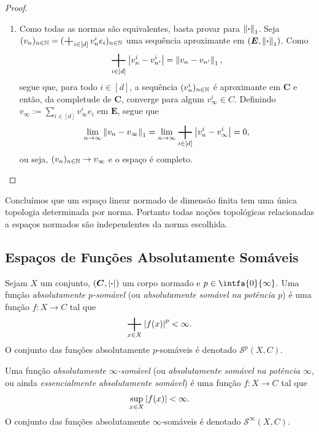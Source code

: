 \begin{proof}
\begin{enumerate}
	\item Como todas as normas são equivalentes, basta provar para $\left\Vert{\bm{\cdot}}\right\Vert_1$. Seja $(v_n)_{n \in \N} = (\sum_{i \in [d]} v_n^i e_i)_{n \in \N}$ uma sequência aproximante em $(\bm E,\left\Vert{\bm{\cdot}}\right\Vert_1)$. Como
		\begin{equation*}
		\sum_{i \in [d]} \abs{v_n^i - v_{n'}^i} = \nor{v_n - v_{n'}}_1,
		\end{equation*}
segue que, para todo $i \in [d]$, a sequência $(v_n^i)_{n \in \mathbb{N}}$ é aproximante em $\bm C$ e então, da completude de $\bm C$, converge para algum $v_\infty^i \in C$. Definindo $v_\infty := \sum_{i \in [d]} v_\infty^ie_i$ em $\bm E$, segue que
	\begin{equation*}
	\lim_{n \conv \infty} \nor{v_n - v_\infty}_1 = \lim_{n \conv \infty} \sum_{i \in [d]} \abs{v_n^i - v_\infty^i} = 0,
	\end{equation*}
ou seja, $(v_n)_{n \in \mathbb{N}} \rightarrow v_\infty$ e o espaço é completo.	
	\end{enumerate}
\end{proof}

Concluímos que um espaço linear normado de dimensão finita tem uma única topologia determinada por norma.
Portanto todas noções topológicas relacionadas a espaços normados são independentes da norma escolhida.














\subsection{Espaços de Funções Absolutamente Somáveis}

\newcommand{\Smvl}{\mathscr{S}}

\begin{defi}
Sejam $X$ um conjunto, $(\bm C,\left\vert{\bm{\cdot}}\right\vert)$ um corpo normado
 e $p \in \intfa{0}{\infty}$. Uma função \emph{absolutamente $p$-somável} (ou \emph{absolutamente somável na potência $p$}) é uma função $f\colon X \to C$ tal que
	\begin{equation*}
	\sum_{x \in X} \abs{f(x)}^p < \infty.
	\end{equation*}
O conjunto das funções absolutamente $p$-somáveis é denotado $\Smvl^p(X,C)$.

Uma função \emph{absolutamente $\infty$-somável} (ou \emph{absolutamente somável na potência $\infty$}, ou ainda \emph{essencialmente absolutamente somável}) é uma função $f\colon X \to C$ tal que
	\begin{equation*}
	\sup_{x \in X} \left\vert{f(x)}\right\vert < \infty.
	\end{equation*}
O conjunto das funções absolutamente $\infty$-somáveis é denotado $\Smvl^\infty(X,C)$.
\end{defi}

